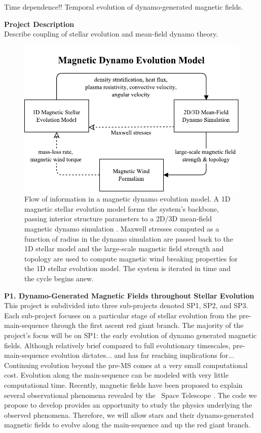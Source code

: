 \documentclass[12pt,a4paper]{article}
\begin{document}
Time dependence!! Temporal evolution of dynamo-generated magnetic fields.



{\bf \large Project Description} \\
Describe coupling of stellar evolution and mean-field dynamo theory. 

\begin{figure}
	\centering
	\includegraphics[width=0.75\linewidth]{./fig/dynamo_evolution.pdf}
	\caption{\small Flow of information in a magnetic dynamo evolution model. A 1D magnetic stellar evolution model \citep[{\sc dmestar};][]{FC12b} forms the system's backbone, passing interior structure parameters to a 2D/3D mean-field magnetic dynamo simulation \citep[{\sc pencil} code;][]{Brandenburg2002}. Maxwell stresses computed as a function of radius in the dynamo simulation are passed back to the 1D stellar model and the large-scale magnetic field strength and topology are used to compute magnetic wind breaking properties \citep[e.g.,][]{Reville2015} for the 1D stellar evolution model. The system is iterated in time and the cycle begins anew.}
	\label{fig:schematic}
\end{figure}

\textbf{P1. Dynamo-Generated Magnetic Fields throughout Stellar Evolution} \\
This project is subdivided into three sub-projects denoted SP1, SP2, and SP3. Each sub-project focuses on a particular stage of stellar evolution from the pre-main-sequence through the first ascent red giant branch. The majority of the project's focus will be on SP1: the early evolution of dynamo generated magnetic fields. Although relatively brief compared to full evolutionary timescales, pre-main-sequence evolution dictates... and has far reaching implications for... Continuing evolution beyond the pre-MS comes at a very small computational cost. Evolution along the main-sequence can be modeled with very little computational time. Recently, magnetic fields have been proposed to explain several observational phenomena revealed by the \kepler\ Space Telescope \citep{Fuller2015, vanSaders2016}. The code we propose to develop provides an opportunity to study the physics underlying the observed phenomena. Therefore, we will allow stars and their dynamo-generated magnetic fields to evolve along the main-sequence and up the red giant branch. 
\end{document}
